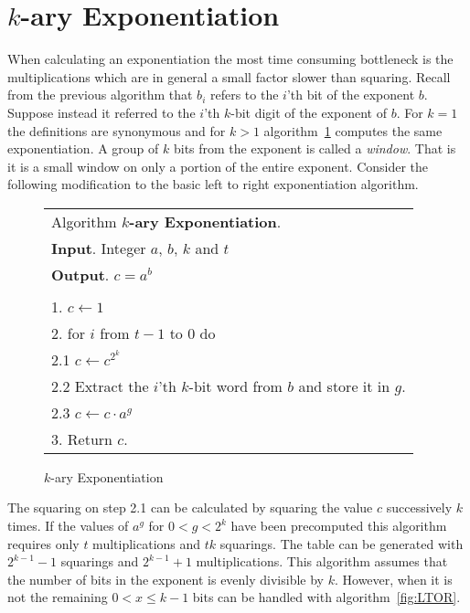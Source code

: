 \documentclass[b5paper]{book}
\begin{document}
\section{$k$-ary Exponentiation}
When calculating an exponentiation the most time consuming bottleneck is the multiplications which are in general a small factor
slower than squaring.  Recall from the previous algorithm that $b_{i}$ refers to the $i$'th bit of the exponent $b$.  Suppose instead it referred to
the $i$'th $k$-bit digit of the exponent of $b$.  For $k = 1$ the definitions are synonymous and for $k > 1$ algorithm~\ref{fig:KARY}
computes the same exponentiation.  A group of $k$ bits from the exponent is called a \textit{window}.  That is it is a small window on only a
portion of the entire exponent.  Consider the following modification to the basic left to right exponentiation algorithm.

\begin{figure}[!here]
\begin{small}
\begin{center}
\begin{tabular}{l}
\hline Algorithm \textbf{$k$-ary Exponentiation}. \\
\textbf{Input}.   Integer $a$, $b$, $k$ and $t$ \\
\textbf{Output}.  $c = a^b$ \\
\hline \\
1.  $c \leftarrow 1$ \\
2.  for $i$ from $t - 1$ to $0$ do \\
\hspace{3mm}2.1  $c \leftarrow c^{2^k} $ \\
\hspace{3mm}2.2  Extract the $i$'th $k$-bit word from $b$ and store it in $g$. \\
\hspace{3mm}2.3  $c \leftarrow c \cdot a^g$ \\
3.  Return $c$. \\
\hline
\end{tabular}
\end{center}
\end{small}
\caption{$k$-ary Exponentiation}
\label{fig:KARY}
\end{figure}

The squaring on step 2.1 can be calculated by squaring the value $c$ successively $k$ times.  If the values of $a^g$ for $0 < g < 2^k$ have been
precomputed this algorithm requires only $t$ multiplications and $tk$ squarings.  The table can be generated with $2^{k - 1} - 1$ squarings and
$2^{k - 1} + 1$ multiplications.  This algorithm assumes that the number of bits in the exponent is evenly divisible by $k$.  
However, when it is not the remaining $0 < x \le k - 1$ bits can be handled with algorithm~\ref{fig:LTOR}.
\end{document}
